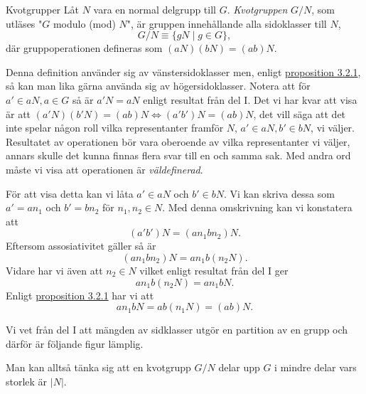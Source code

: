 \documentclass{article}
\theoremstyle{definition}
\begin{document}
\begin{mydef}{Kvotgrupper}{}
  Låt $N$ vara en normal delgrupp till $G$. \textit{Kvotgruppen} $G/N$, som utläses "$G$ modulo (mod) $N$", är gruppen innehållande alla 
  sidoklasser till $N$, 
  \[G/N \equiv \{gN \; | \; g \in G\},\]
  där gruppoperationen defineras som $(aN) (bN) = (ab)N$. 
\end{mydef}
Denna definition använder sig av vänstersidoklasser men, enligt \hyperlink{prop1}{proposition 3.2.1}, så kan man lika gärna använda sig 
av högersidoklasser. Notera att för $a' \in aN, a \in G$ så är $a'N = aN$ enligt resultat från del I. Det vi har kvar att visa är att $(a'N) (b'N) = (ab)N
\iff (a'b')N = (ab)N$, det vill säga att det inte spelar någon roll vilka representanter framför $N$, $a' \in aN, b' \in bN$, vi väljer. Resultatet av 
operationen bör vara oberoende av vilka representanter vi väljer, annars skulle det kunna finnas flera svar till en och samma sak. Med 
andra ord måste vi visa att operationen är \textit{väldefinerad}.

För att visa detta kan vi låta $a' \in aN$ och $b' \in bN$. Vi kan skriva dessa som $a' = an_1$ och $b' = bn_2$ för $n_1, n_2 \in N$. Med denna 
omskrivning kan vi konstatera att
\[(a'b')N = (an_1bn_2)N.\]
Eftersom assosiativitet gäller så är 
\[(an_1bn_2)N = an_1b(n_2N).\]
Vidare har vi även att $n_2 \in N$ vilket enligt resultat från del I ger 
\[an_1b(n_2N) = an_1bN.\]
Enligt \hyperlink{prop1}{proposition 3.2.1} har vi att 
\[an_1bN = ab(n_1N) = (ab)N.\]

Vi vet från del I att mängden av sidklasser utgör en partition av en grupp och därför är följande figur lämplig.

\begin{center}
\end{center}
Man kan alltså tänka sig att en kvotgrupp $G/N$ delar upp $G$ i mindre delar vars storlek är $|N|$. 
\end{document}
